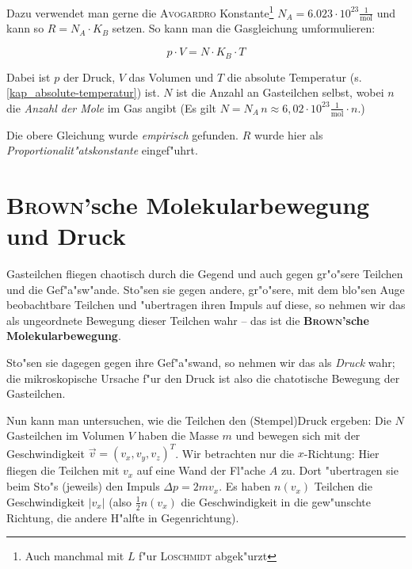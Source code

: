 Dazu verwendet man gerne die
\textsc{Avogardro} Konstante\footnote{Auch
  manchmal mit $L$ f"ur \textsc{Loschmidt} abgek"urzt}
$N_A = 6.023 \cdot 10^{ 23 } \frac{1}{\operatorname{mol}}$ und kann so
$R = N_A \cdot K_B$ setzen. So kann man die Gasgleichung
umformulieren:

\begin{equation}
   \label{eq:429}
   \boxed { p \cdot V = N \cdot K_B \cdot T  }
\end{equation}


Dabei ist $p$ der Druck, $V$ das Volumen und $T$ die absolute
Temperatur (s. \ref{kap_absolute-temperatur}) ist. $N$ ist die Anzahl
an Gasteilchen selbst, wobei $n$ die \emph{Anzahl der Mole}
im Gas angibt (Es gilt $N = N_A\, n \approx 6,02\cdot10^{23}
\frac{1}{\operatorname{mol}} \cdot n$.)

Die obere Gleichung wurde \emph{empirisch} gefunden. $R$ wurde hier
als \emph{Proportionalit"atskonstante} eingef"uhrt.







\section{\textsc{Brown}'sche Molekularbewegung und Druck}
\label{kap_brownsche-molekularbewegung}

Gasteilchen fliegen chaotisch durch die Gegend und auch gegen
gr"o"sere Teilchen und die Gef"a"sw"ande.  Sto"sen sie gegen andere,
gr"o"sere, mit dem blo"sen Auge beobachtbare Teilchen und "ubertragen
ihren Impuls auf diese, so nehmen wir das als ungeordnete Bewegung
dieser Teilchen wahr -- das ist die \textbf{\textsc{Brown}'sche Molekularbewegung}.

Sto"sen sie dagegen gegen ihre Gef"a"swand, so nehmen wir das als
\emph{Druck} wahr; die mikroskopische Ursache f"ur den Druck ist also
die chatotische Bewegung der Gasteilchen.

Nun kann man untersuchen, wie die Teilchen den (Stempel)Druck ergeben:
Die $N$ Gasteilchen im Volumen $V$ haben die Masse $m$ und bewegen
sich mit der Geschwindigkeit $\vec v = (v_x,v_y,v_z)^T$. Wir
betrachten nur die $x$-Richtung: Hier fliegen die Teilchen mit $v_x$
auf eine Wand der Fl"ache $A$ zu. Dort "ubertragen sie beim Sto"s
(jeweils) den Impuls $\Delta p = 2mv_x$. Es haben $n(v_x)$ Teilchen
die Geschwindigkeit $|v_x|$ (also $\frac{1}{2}n(v_x)$ die
Geschwindigkeit in die gew"unschte Richtung, die andere H"alfte in
Gegenrichtung).

